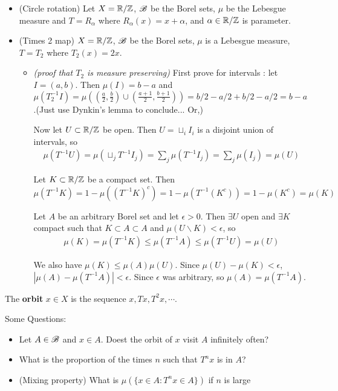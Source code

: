 \documentclass[10pt,a4paper]{report}
\begin{document}
\begin{itemize}
\item (Circle rotation) Let $X = \mathbb{R}/ \mathbb{Z}$, $\mathscr{B}$ be the Borel sets, $\mu$ be the Lebesgue measure and $T = R_{\alpha}$ where $R_{\alpha}(x) = x+\alpha$, and $\alpha \in \mathbb{R}/\mathbb{Z}$ is parameter.

\item (Times 2 map) $X = \mathbb{R}/\mathbb{Z}$, $\mathscr{B}$ be the Borel sets, $\mu$ is a Lebesgue measure, $T = T_2$ where $T_2(x) = 2x$.

\begin{itemize}
\item[ ] \textsl{(proof that $T_2$ is measure preserving)} First prove for intervals : let $I = (a,b)$. Then $\mu(I) = b-a$ and $\mu(T_2^{-1} I)= \mu((\frac{a}{2},\frac{b}{2}) \cup (\frac{a+1}{2},\frac{b+1}{2})) = b/2 - a/2 + b/2 - a/2 = b-a$.(Just use Dynkin's lemma to conclude... Or,)

Now let $U \subset \mathbb{R} / \mathbb{Z}$ be open. Then $U = \sqcup_{i} I_i$ is a disjoint union of intervals, so
\begin{align*}
\mu(T^{-1}U) = \mu(\sqcup_j T^{-1}I_j) = \sum_j \mu(T^{-1} I_j) = \sum_{j} \mu(I_j) = \mu(U)
\end{align*}

Let $K \subset \mathbb{R}/\mathbb{Z}$ be a compact set. Then
\begin{equation*}
\mu(T^{-1}K) = 1- \mu((T^{-1}K)^c) = 1- \mu(T^{-1}(K^c)) = 1- \mu(K^c) = \mu(K)
\end{equation*}

Let $A$ be an arbitrary Borel set and let $\epsilon >0$. Then $\exists U$ open and $\exists K$ compact such that $K\subset A \subset A$ and $\mu(U \backslash K) < \epsilon$, so
\begin{align*}
\mu(K) = \mu(T^{-1} K) \leq \mu(T^{-1} A) \leq \mu(T^{-1} U) = \mu(U)
\end{align*}

We also have $\mu(K) \leq \mu(A) \mu(U)$. Since $\mu(U) - \mu(K) < \epsilon$, $|\mu(A) - \mu(T^{-1}A) | < \epsilon$. Since $\epsilon$ was arbitrary, so $\mu(A) = \mu(T^{-1} A)$.

\eop
\end{itemize}
\end{itemize}
\s

The \textbf{orbit} $x \in X$ is the sequence $x, Tx, T^2 x, \cdots$.
\s

Some Questions:

\begin{itemize}
\item Let $A \in \mathscr{B}$ and $ x\in A$. Doest the orbit of $x$ visit $A$ infinitely often?

\item What is the proportion of the times $n$ such that $T^n x$ is in $A$? 

\item (Mixing property) What is $\mu(\{x \in A : T^nx \in A\})$ if $n$ is large
\end{itemize}
\s
\end{document}

